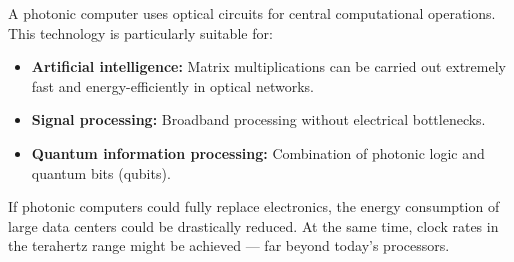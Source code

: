 A photonic computer uses optical circuits for central computational operations. This technology is particularly suitable for:
\begin{itemize}
	\item \textbf{Artificial intelligence:} Matrix multiplications can be carried out extremely fast and energy-efficiently in optical networks.
	\item \textbf{Signal processing:} Broadband processing without electrical bottlenecks.
	\item \textbf{Quantum information processing:} Combination of photonic logic and quantum bits (qubits).
\end{itemize}
\vspace{1em}
\begin{tcolorbox}[hypobox, title={What If Optical Computers Replaced Electronics?}]
	\label{box:optlogik_zukunft}
	\small
	If photonic computers could fully replace electronics, the energy consumption of large data centers could be drastically reduced. At the same time, clock rates in the terahertz range might be achieved — far beyond today’s processors.
\end{tcolorbox}


